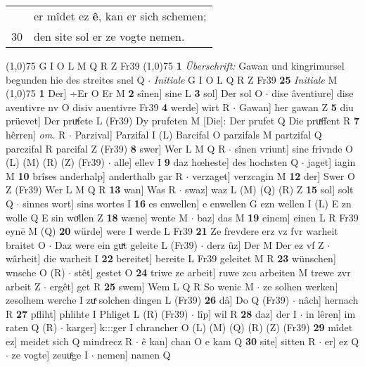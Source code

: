 \documentclass[8pt,a4paper,notitlepage]{article}
\begin{document}
\begin{table}[ht]
\begin{minipage}[t]{0.5\linewidth}
\begin{tabular}{rl}
 & er mîdet ez \textbf{ê}, kan er sich schemen;\\ 
30 & den site sol er ze vogte nemen.\\ 
\end{tabular}
\scriptsize
\line(1,0){75} \newline
G I O L M Q R Z Fr39 \newline
\line(1,0){75} \newline
\textbf{1} \textit{Überschrift:} Gawan und kingrimursel begunden hie des streites snel Q   $\cdot$ \textit{Initiale} G I O L Q R Z Fr39  \textbf{25} \textit{Initiale} M  \newline
\line(1,0){75} \newline
\textbf{1} Der] ÷Er O Er M \textbf{2} sînen] sine L \textbf{3} sol] Der sol O  $\cdot$ dise âventiure] dise aventivre nv O disiv auentivre Fr39 \textbf{4} werde] wirt R  $\cdot$ Gawan] her gawan Z \textbf{5} diu prüevet] Der pruͯfete L (Fr39) Dy prufeten M [Die]: Der prufet Q Die pruͯffent R \textbf{7} hêrren] \textit{om.} R  $\cdot$ Parzival] Parzifal I (L) Barcifal O parzifals M partzifal Q parczifal R parcifal Z (Fr39) \textbf{8} swer] Wer L M Q R  $\cdot$ sînen vriunt] sine frivnde O (L) (M) (R) (Z) (Fr39)  $\cdot$ alle] ellev I \textbf{9} daz hœheste] des hochsten Q  $\cdot$ jaget] iagin M \textbf{10} brîses anderhalp] anderthalb gar R  $\cdot$ verzaget] verzcagin M \textbf{12} der] Swer O Z (Fr39) Wer L M Q R \textbf{13} wan] Was R  $\cdot$ swaz] waz L (M) (Q) (R) Z \textbf{15} sol] solt Q  $\cdot$ sinnes wort] sins wortes I \textbf{16} es enwellen] e enwellen G ezn wellen I (L) E zn wolle Q E sin woͤllen Z \textbf{18} wæne] wente M  $\cdot$ baz] das M \textbf{19} einem] einen L R Fr39 eynē M (Q) \textbf{20} würde] were I werde L Fr39 \textbf{21} Ze frevdere erz vz fvr warheit braitet O  $\cdot$ Daz were ein guͯt geleite L (Fr39)  $\cdot$ derz ûz] Der M Der ez vf Z  $\cdot$ wârheit] die warheit I \textbf{22} bereitet] bereite L Fr39 geleitet M R \textbf{23} wünschen] wnsche O (R)  $\cdot$ stêt] gestet O \textbf{24} triwe ze arbeit] ruwe zcu arbeiten M trewe zvr arbeit Z  $\cdot$ ergêt] get R \textbf{25} swem] Wem L Q R So wenic M  $\cdot$ ze solhen werken] zesolhem werche I zuͯ solchen dingen L (Fr39) \textbf{26} dâ] Do Q (Fr39)  $\cdot$ nâch] hernach R \textbf{27} pfliht] phlihte I Phliget L (R) (Fr39)  $\cdot$ lîp] wil R \textbf{28} daz] der I  $\cdot$ in lêren] im raten Q (R)  $\cdot$ karger] k:::ger I chrancher O (L) (M) (Q) (R) (Z) (Fr39) \textbf{29} mîdet ez] meidet sich Q mindrecz R  $\cdot$ ê kan] chan O e kam Q \textbf{30} site] sitten R  $\cdot$ er] ez Q  $\cdot$ ze vogte] zeuuͤge I  $\cdot$ nemen] namen Q \newline

\end{minipage}
\end{table}
\end{document}
